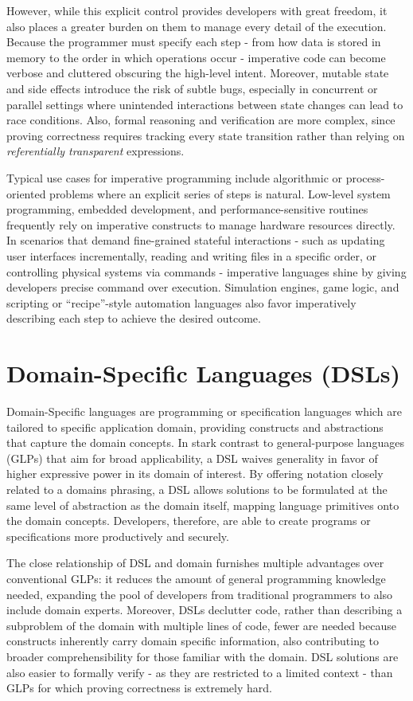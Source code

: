 However, while this explicit control provides developers with great freedom, it also places a greater burden on them to manage every detail of the execution.
Because the programmer must specify each step - from how data is stored in memory to the order in which operations occur - imperative code can become verbose and cluttered obscuring the high-level intent.
Moreover, mutable state and side effects introduce the risk of subtle bugs, especially in concurrent or parallel settings where unintended interactions between state changes
can lead to race conditions. Also, formal reasoning and verification are more complex, since proving correctness requires tracking every state
transition rather than relying on \textit{referentially transparent} expressions.

Typical use cases for imperative programming include algorithmic or process-oriented problems where an explicit series of steps is natural.
Low-level system programming, embedded development, and performance-sensitive routines frequently rely on imperative constructs to manage hardware resources directly.
In scenarios that demand fine-grained stateful interactions - such as updating user interfaces incrementally, reading and writing files in a specific order, or
controlling physical systems via commands - imperative languages shine by giving developers precise command over execution.
Simulation engines, game logic, and scripting or “recipe”-style automation languages also favor imperatively describing each step to achieve the desired outcome.

\section{Domain-Specific Languages (DSLs)}

Domain-Specific languages are programming or specification languages which are tailored to specific application domain, providing constructs and abstractions
that capture the domain concepts. \cite{whenHowDSL} In stark contrast to general-purpose languages (GLPs) that aim for broad applicability, a DSL waives generality in favor
of higher expressive power in its domain of interest. By offering notation closely related to a domains phrasing, a DSL allows solutions to be formulated at the same level
of abstraction as the domain itself, mapping language primitives onto the domain concepts. Developers, therefore, are able to create programs or specifications more
productively and securely.

The close relationship of DSL and domain furnishes multiple advantages over conventional GLPs: it reduces the amount of general programming knowledge needed,
expanding the pool of developers from traditional programmers to also include domain experts. Moreover, DSLs declutter code, rather than describing a subproblem of the domain
with multiple lines of code, fewer are needed because constructs inherently carry domain specific information, also contributing to broader comprehensibility for those familiar with the domain.
DSL solutions are also easier to formally verify - as they are restricted to a limited context - than GLPs for which proving correctness is extremely hard.

